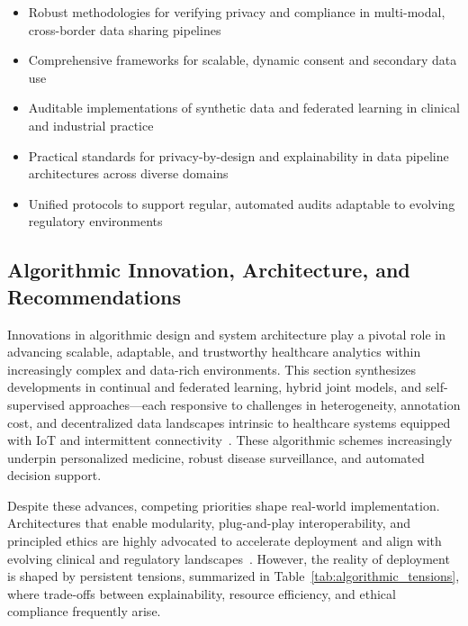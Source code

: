 \documentclass[sigconf]{acmart}
\begin{document}
\begin{itemize}
\item Robust methodologies for verifying privacy and compliance in multi-modal, cross-border data sharing pipelines
\item Comprehensive frameworks for scalable, dynamic consent and secondary data use
\item Auditable implementations of synthetic data and federated learning in clinical and industrial practice
\item Practical standards for privacy-by-design and explainability in data pipeline architectures across diverse domains
\item Unified protocols to support regular, automated audits adaptable to evolving regulatory environments
\end{itemize}

\subsection{Algorithmic Innovation, Architecture, and Recommendations}

Innovations in algorithmic design and system architecture play a pivotal role in advancing scalable, adaptable, and trustworthy healthcare analytics within increasingly complex and data-rich environments. This section synthesizes developments in continual and federated learning, hybrid joint models, and self-supervised approaches---each responsive to challenges in heterogeneity, annotation cost, and decentralized data landscapes intrinsic to healthcare systems equipped with IoT and intermittent connectivity~\cite{ref36, ref37, ref42, ref43, ref46, ref50, ref54, ref61, ref65, ref70, ref71, ref72, ref74, ref75, ref76, ref77, ref78, ref79, ref90, ref104, ref105, ref107}. These algorithmic schemes increasingly underpin personalized medicine, robust disease surveillance, and automated decision support.

Despite these advances, competing priorities shape real-world implementation. Architectures that enable modularity, plug-and-play interoperability, and principled ethics are highly advocated to accelerate deployment and align with evolving clinical and regulatory landscapes~\cite{ref7, ref11, ref12, ref13, ref14, ref16, ref17, ref18, ref19, ref20, ref21, ref22, ref23, ref24, ref25, ref28, ref30, ref32, ref33, ref34, ref35, ref41, ref43, ref44, ref45, ref46, ref49, ref50, ref60, ref61, ref62, ref63, ref64, ref65, ref70, ref71, ref72, ref73, ref74, ref75, ref76, ref77, ref78, ref79, ref80, ref84, ref106, ref107}. However, the reality of deployment is shaped by persistent tensions, summarized in Table~\ref{tab:algorithmic_tensions}, where trade-offs between explainability, resource efficiency, and ethical compliance frequently arise.
\end{document}
